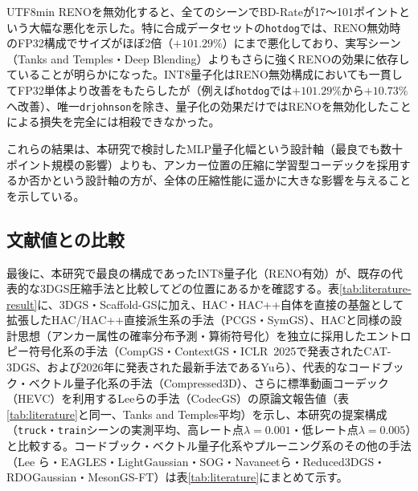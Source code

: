 \documentclass{ieeeaccess}
\begin{document}
\begin{CJK}{UTF8}{min}
RENOを無効化すると、全てのシーンでBD-Rateが17〜101ポイントという大幅な悪化を示した。特に合成データセットの\texttt{hotdog}では、RENO無効時のFP32構成でサイズがほぼ2倍（$+101.29\%$）にまで悪化しており、実写シーン（Tanks and Temples・Deep Blending）よりもさらに強くRENOの効果に依存していることが明らかになった。INT8量子化はRENO無効構成においても一貫してFP32単体より改善をもたらしたが（例えば\texttt{hotdog}では$+101.29\%$から$+10.73\%$へ改善）、唯一\texttt{drjohnson}を除き、量子化の効果だけではRENOを無効化したことによる損失を完全には相殺できなかった。

これらの結果は、本研究で検討したMLP量子化幅という設計軸（最良でも数十ポイント規模の影響）よりも、アンカー位置の圧縮に学習型コーデックを採用するか否かという設計軸の方が、全体の圧縮性能に遥かに大きな影響を与えることを示している。

\subsection{文献値との比較}
最後に、本研究で最良の構成であったINT8量子化（RENO有効）が、既存の代表的な3DGS圧縮手法と比較してどの位置にあるかを確認する。表\ref{tab:literature-result}に、3DGS・Scaffold-GSに加え、HAC・HAC++自体を直接の基盤として拡張したHAC/HAC++直接派生系の手法（PCGS\cite{chen2025pcgs}・SymGS\cite{gupta2025symgs}）、HACと同様の設計思想（アンカー属性の確率分布予測・算術符号化）を独立に採用したエントロピー符号化系の手法（CompGS\cite{liu2024compgs}・ContextGS・ICLR~2025で発表されたCAT-3DGS\cite{zhan2025cat3dgs}、および2026年に発表された最新手法であるYuら\cite{yu2026practical}）、代表的なコードブック・ベクトル量子化系の手法（Compressed3D\cite{niedermayr2024compressed}）、さらに標準動画コーデック（HEVC）を利用するLeeら\cite{lee2025codecgs}の手法（CodecGS）の原論文報告値（表\ref{tab:literature}と同一、Tanks and Temples平均）を示し、本研究の提案構成（\texttt{truck}・\texttt{train}シーンの実測平均、高レート点$\lambda=0.001$・低レート点$\lambda=0.005$）と比較する。コードブック・ベクトル量子化系やプルーニング系のその他の手法（Lee ら・EAGLES・LightGaussian・SOG・Navaneetら・Reduced3DGS・RDOGaussian・MesonGS-FT）は表\ref{tab:literature}にまとめて示す。


\end{CJK}
\end{document}
